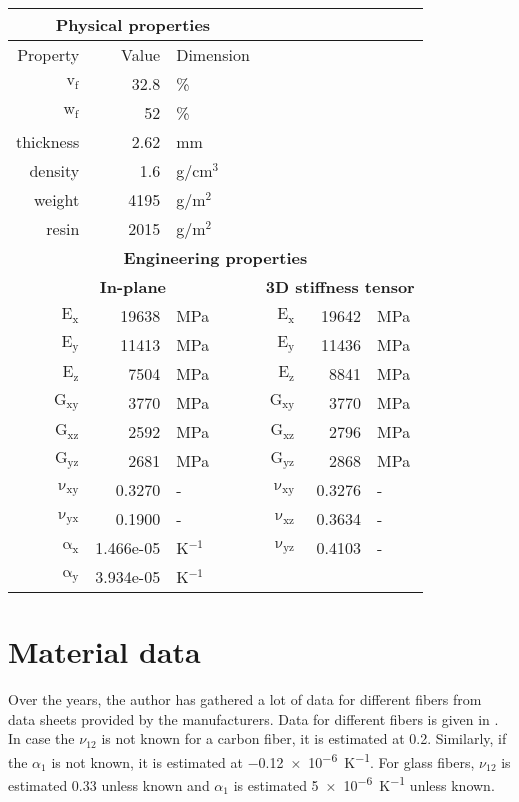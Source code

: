 \documentclass[a4paper,landscape,oneside,11pt,twocolumn]{memoir}
\begin{document}
\begin{table}[!htbp]
    \begin{tabular}[t]{rrlrrl}
      \multicolumn{3}{c}{\small\textbf{Physical properties}}\\[0.1em]
      \toprule
      Property & Value & Dimension\\
      \midrule
      $\mathrm{v_f}$ & 32.8 &\%\\
      $\mathrm{w_f}$ & 52 &\%\\
      thickness & 2.62 & mm\\
      density & 1.6 & g/cm$^3$\\
      weight & 4195 & g/m$^2$\\
      resin & 2015 & g/m$^2$\\
      \midrule
      \multicolumn{6}{c}{\small\textbf{Engineering properties}}\\[0.1em]
      \multicolumn{3}{c}{\small\textbf{In-plane}} &
        \multicolumn{3}{c}{\small\textbf{3D stiffness tensor}}\\[0.1em]
      $\mathrm{E_x}$ &    19638 & MPa & $\mathrm{E_x}$ &    19642 & MPa\\
      $\mathrm{E_y}$ &    11413 & MPa & $\mathrm{E_y}$ &    11436 & MPa\\
      $\mathrm{E_z}$ &     7504 & MPa & $\mathrm{E_z}$ &     8841 & MPa\\
      $\mathrm{G_{xy}}$ &     3770 & MPa & $\mathrm{G_{xy}}$ &     3770 & MPa\\
      $\mathrm{G_{xz}}$ &     2592 & MPa & $\mathrm{G_{xz}}$ &     2796 & MPa\\
      $\mathrm{G_{yz}}$ &     2681 & MPa &  $\mathrm{G_{yz}}$ &     2868 & MPa\\
      $\mathrm{\nu_{xy}}$ & 0.3270 &- &$\mathrm{\nu_{xy}}$ & 0.3276 &-\\
      $\mathrm{\nu_{yx}}$ & 0.1900 &- & $\mathrm{\nu_{xz}}$ & 0.3634 &-\\
      $\mathrm{\alpha_x}$ & 1.466e-05 & K$^{-1}$ &$\mathrm{\nu_{yz}}$ & 0.4103 &-\\
      $\mathrm{\alpha_y}$ & 3.934e-05 & K$^{-1}$\\
      \bottomrule
    \end{tabular}
\end{table}


\section{Material data} %

Over the years, the author has gathered a lot of data for different fibers
from data sheets provided by the manufacturers. Data for different
fibers is given in . In case the $\nu_{12}$ is not
known for a carbon fiber, it is estimated at 0.2. Similarly, if the
$\alpha_1$ is not known, it is estimated at \SI{-0.12e-6}{K^{-1}}. For glass
fibers, $\nu_{12}$ is estimated 0.33 unless known and $\alpha_1$ is estimated
\SI{5e-6}{K^{-1}} unless known.
\end{document}
